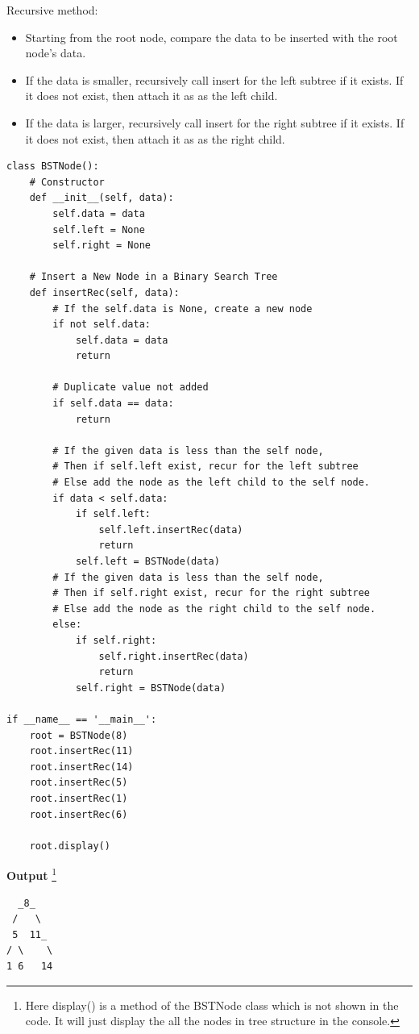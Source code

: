 \documentclass[a4paper,11pt]{book}
\begin{document}
\noindent Recursive method: 

\begin{itemize}
    \item Starting from the root node, compare the data to be inserted with the root node's data.
    \item If the data is smaller, recursively call insert for the left subtree if it exists. If it does not exist, then attach it as as the left child.
    \item If the data is larger, recursively call insert for the right subtree if it exists. If it does not exist, then attach it as as the right child.
\end{itemize} 

\begin{lstlisting}
class BSTNode():
    # Constructor
    def __init__(self, data):
        self.data = data
        self.left = None
        self.right = None
        
    # Insert a New Node in a Binary Search Tree 
    def insertRec(self, data):
        # If the self.data is None, create a new node
        if not self.data:
            self.data = data
            return

        # Duplicate value not added
        if self.data == data:
            return

        # If the given data is less than the self node, 
        # Then if self.left exist, recur for the left subtree
        # Else add the node as the left child to the self node.
        if data < self.data:
            if self.left:
                self.left.insertRec(data)
                return
            self.left = BSTNode(data)
        # If the given data is less than the self node, 
        # Then if self.right exist, recur for the right subtree
        # Else add the node as the right child to the self node.
        else:
            if self.right:
                self.right.insertRec(data)
                return
            self.right = BSTNode(data)
                
if __name__ == '__main__':
    root = BSTNode(8)
    root.insertRec(11)
    root.insertRec(14)
    root.insertRec(5)
    root.insertRec(1)
    root.insertRec(6)

    root.display() 
\end{lstlisting}
\textbf{Output} \footnote{Here display() is a method of the BSTNode class which is not shown in the code. It will just display the all the nodes in tree structure in the console.}
\begin{lstlisting}
  _8_   
 /   \  
 5  11_ 
/ \    \
1 6   14
\end{lstlisting}
\end{document}
